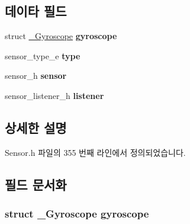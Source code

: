 \subsection*{데이타 필드}
\begin{DoxyCompactItemize}
\item 
\hypertarget{struct___gyroscope_extend_a2836faf982e7b52971a419061d4a4ae7}{struct \hyperlink{struct___gyroscope}{\-\_\-\-Gyroscope} {\bfseries gyroscope}}\label{struct___gyroscope_extend_a2836faf982e7b52971a419061d4a4ae7}

\item 
\hypertarget{struct___gyroscope_extend_abffb09766da2fc510a79bb51f82a36e1}{sensor\-\_\-type\-\_\-e {\bfseries type}}\label{struct___gyroscope_extend_abffb09766da2fc510a79bb51f82a36e1}

\item 
\hypertarget{struct___gyroscope_extend_a5bae9b7801bc3808411925cde81d3f26}{sensor\-\_\-h {\bfseries sensor}}\label{struct___gyroscope_extend_a5bae9b7801bc3808411925cde81d3f26}

\item 
\hypertarget{struct___gyroscope_extend_aa977dfb866b24fd7d9a20a9a01b2fd1f}{sensor\-\_\-listener\-\_\-h {\bfseries listener}}\label{struct___gyroscope_extend_aa977dfb866b24fd7d9a20a9a01b2fd1f}

\end{DoxyCompactItemize}


\subsection{상세한 설명}


Sensor.\-h 파일의 355 번째 라인에서 정의되었습니다.



\subsection{필드 문서화}
\hypertarget{struct___gyroscope_extend_a2836faf982e7b52971a419061d4a4ae7}{
\subsubsection[{gyroscope}]{\setlength{\rightskip}{0pt plus 5cm}struct {\bf \-\_\-\-Gyroscope} gyroscope}}\label{struct___gyroscope_extend_a2836faf982e7b52971a419061d4a4ae7}


